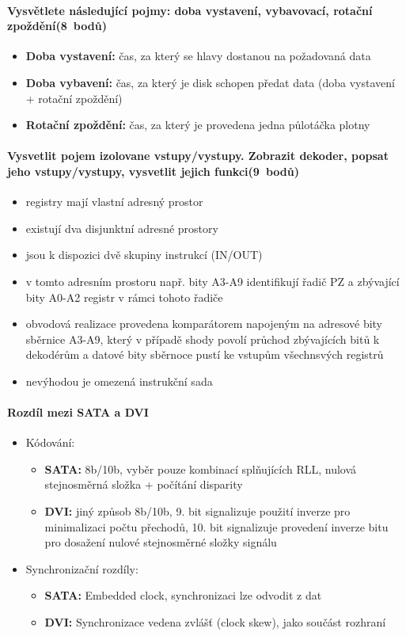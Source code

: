 \documentclass[a5paper,10pt]{article}
\begin{document}
\paragraph{Vysvětlete následující pojmy: doba vystavení, vybavovací, rotační zpoždění\hfill(8~bodů)}
\begin{itemize}
	\item \textbf{Doba vystavení:} čas, za který se hlavy dostanou na požadovaná data
	\item \textbf{Doba vybavení:} čas, za který je disk schopen předat data (doba vystavení + rotační zpoždění)
	\item \textbf{Rotační zpoždění:} čas, za který je provedena jedna půlotáčka plotny
\end{itemize}

\paragraph{Vysvetlit pojem izolovane vstupy/vystupy. Zobrazit dekoder, popsat jeho vstupy/vystupy, vysvetlit jejich funkci\hfill(9~bodů)}
\begin{itemize}
	\item registry mají vlastní adresný prostor
	\item existují dva disjunktní adresné prostory
	\item jsou k dispozici dvě skupiny instrukcí (IN/OUT)	
	\item v tomto adresním prostoru např. bity A3-A9 identifikují řadič PZ a zbývající bity A0-A2 registr v rámci tohoto řadiče
	\item obvodová realizace provedena komparátorem napojeným na adresové bity sběrnice A3-A9, který v případě shody povolí průchod zbývajících bitů k dekodérům a datové bity sběrnoce pustí ke vstupům všechnsvých registrů
	\item nevýhodou je omezená instrukční sada
\end{itemize}

\paragraph{Rozdíl mezi SATA a DVI}
\begin{itemize}
	\item Kódování:
	\begin{itemize}
		\item \textbf{SATA:} 8b/10b, vyběr pouze kombinací splňujících RLL, nulová stejnosměrná složka + počítání disparity
		\item \textbf{DVI:} jiný způsob 8b/10b, 9. bit signalizuje použití inverze pro minimalizaci počtu přechodů, 10. bit signalizuje provedení inverze bitu pro dosažení nulové stejnosměrné složky signálu
	\end{itemize}	
	\item Synchronizační rozdíly:
	\begin{itemize}
		\item \textbf{SATA:} Embedded clock, synchronizaci lze odvodit z dat
		\item \textbf{DVI:} Synchronizace vedena zvlášť (clock skew), jako součást rozhraní	
	\end{itemize}
\end{itemize}
\end{document}
